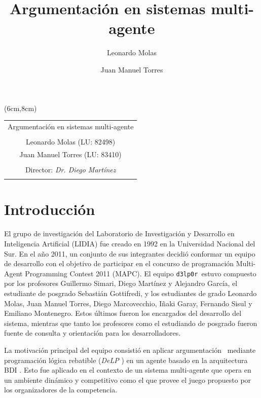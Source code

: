 \documentclass[oneside]{book}
\title{Argumentación en sistemas multi-agente} %
\author{Leonardo Molas \and Juan Manuel Torres}
\theoremstyle{definition}
\newcommand{\DLP}{\mbox{\textit{DeLP}}}
\begin{document}


\thispagestyle{empty}

\begin{textblock*}{10cm} (6cm,8cm) %
\begin{center}
\begin{tabular}{c}
{\LARGE Argumentación en sistemas multi-agente} \\
\\
Leonardo Molas (LU: 82498)\\
Juan Manuel Torres (LU: 83410)\\
\\
Director: \emph{Dr. Diego Martínez}\\
\\
\end{tabular}
\end{center}
\end{textblock*}
\null
\vfill
\pagebreak
\thispagestyle{empty}

\setcounter{page}{1}


\tableofcontents

\chapter*{Introducción}


El grupo de investigación del Laboratorio de Investigación y Desarrollo en 
Inteligencia Artificial (LIDIA) fue creado en 1992 en la Universidad Nacional 
del Sur. En el año 2011, un conjunto de sus integrantes decidió conformar un 
equipo de desarrollo con el objetivo de participar en el concurso de programación 
Multi-Agent Programming Contest 2011 (MAPC). El equipo \texttt{d3lp0r}\ estuvo compuesto
por los profesores Guillermo Simari, Diego Martínez y Alejandro García, el estudiante
de posgrado Sebastián Gottifredi, y los estudiantes de grado Leonardo Molas, 
Juan Manuel Torres, Diego Marcovecchio, Iñaki Garay, Fernando Sisul y Emiliano Montenegro.
Estos últimos fueron los encargados del desarrollo del sistema, mientras que tanto
los profesores como el estudiando de posgrado fueron fuente de consulta y orientación
para los desarrolladores.
	
La motivación principal del equipo consistió en aplicar argumentación \cite{Prakken:1997} 
\cite{Rahwan:2009} \cite{Bench-Capon:2007}\ mediante programación lógica rebatible (\DLP
\cite{Garcia:2004a}) en un agente basado en la arquitectura BDI \cite{Amgoud:2008}. Esto
fue aplicado en el contexto de un sistema multi-agente que opera en un ambiente dinámico
y competitivo como el que provee el juego propuesto por los organizadores de la competencia. 
	
\end{document}
